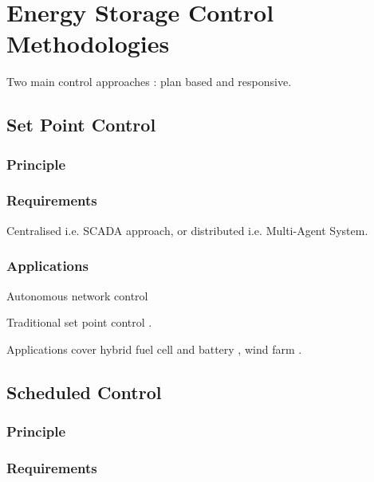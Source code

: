 \section{Energy Storage Control Methodologies}
\label{ch-review:sec:energy-storage-control-methodologies}

Two main control approaches \cite{Hida2010}: plan based and responsive.


\subsection{Set Point Control}

\subsubsection{Principle}

\subsubsection{Requirements}

Centralised i.e. SCADA approach, or distributed i.e. Multi-Agent System.

\subsubsection{Applications}

Autonomous network control \cite{Nogaret1997a}

Traditional set point control \cite{Leadbetter2012}.

Applications cover hybrid fuel cell and battery \cite{Jiang2007}, wind farm \cite{Teleke2009a}.

\subsection{Scheduled Control}

\subsubsection{Principle}

\subsubsection{Requirements}

